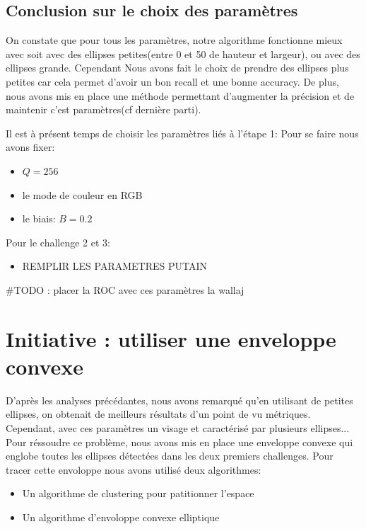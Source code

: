 \documentclass[a4paper,12pt, openany]{book}
\theoremstyle{break}
\begin{document}
\subsection{Conclusion sur le choix des paramètres}
On constate que pour tous les paramètres, notre algorithme fonctionne mieux avec soit avec des ellipses petites(entre 0 et 50 de hauteur et largeur), ou avec des ellipses grande. Cependant Nous avons fait le choix de prendre des ellipses plus petites car cela permet d'avoir un bon recall et une bonne accuracy. De plus, nous avons mis en place une méthode permettant d'augmenter la précision et de maintenir c'est paramètres(cf dernière parti).

Il est à présent temps de choisir les paramètres liés à l'étape 1: Pour se faire nous avons fixer:

\begin{itemize}
  \item $Q = 256$
  \item le mode de couleur en RGB
  \item le biais: $B = 0.2$
\end{itemize}

Pour le challenge 2 et 3:

\begin{itemize}
  \item REMPLIR LES PARAMETRES PUTAIN
\end{itemize}

\#TODO : placer la ROC avec ces paramètres la wallaj

\section{Initiative : utiliser une enveloppe convexe}
D'après les analyses précédantes, nous avons remarqué qu'en utilisant de petites ellipses, on obtenait de meilleurs résultats d'un point de vu métriques. Cependant, avec ces paramètres un visage et caractérisé par plusieurs ellipses... Pour réssoudre ce problème, nous avons mis en place une enveloppe convexe qui englobe toutes les ellipses détectées dans les deux premiers challenges.
Pour tracer cette envoloppe nous avons utilisé deux algorithmes:

\begin{itemize}
  \item Un algorithme de clustering pour patitionner l'espace
  \item Un algorithme d'envoloppe convexe elliptique
\end{itemize}
\end{document}
